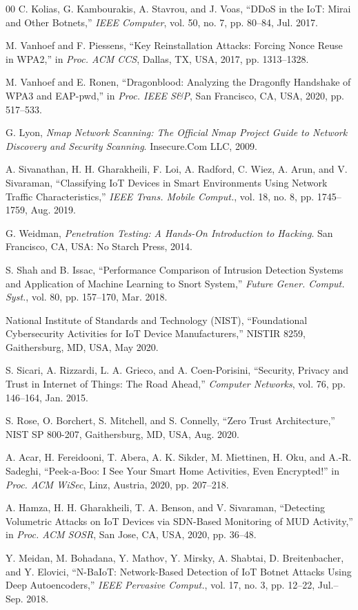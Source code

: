 \documentclass[conference]{IEEEtran}
\begin{document}
\begin{thebibliography}{00}
C. Kolias, G. Kambourakis, A. Stavrou, and J. Voas, ``DDoS in the IoT: Mirai and Other Botnets,'' \textit{IEEE Computer}, vol. 50, no. 7, pp. 80--84, Jul. 2017.

M. Vanhoef and F. Piessens, ``Key Reinstallation Attacks: Forcing Nonce Reuse in WPA2,'' in \textit{Proc. ACM CCS}, Dallas, TX, USA, 2017, pp. 1313--1328.

M. Vanhoef and E. Ronen, ``Dragonblood: Analyzing the Dragonfly Handshake of WPA3 and EAP-pwd,'' in \textit{Proc. IEEE S\&P}, San Francisco, CA, USA, 2020, pp. 517--533.

G. Lyon, \textit{Nmap Network Scanning: The Official Nmap Project Guide to Network Discovery and Security Scanning}. Insecure.Com LLC, 2009.

A. Sivanathan, H. H. Gharakheili, F. Loi, A. Radford, C. Wiez, A. Arun, and V. Sivaraman, ``Classifying IoT Devices in Smart Environments Using Network Traffic Characteristics,'' \textit{IEEE Trans. Mobile Comput.}, vol. 18, no. 8, pp. 1745--1759, Aug. 2019.

G. Weidman, \textit{Penetration Testing: A Hands-On Introduction to Hacking}. San Francisco, CA, USA: No Starch Press, 2014.

S. Shah and B. Issac, ``Performance Comparison of Intrusion Detection Systems and Application of Machine Learning to Snort System,'' \textit{Future Gener. Comput. Syst.}, vol. 80, pp. 157--170, Mar. 2018.

National Institute of Standards and Technology (NIST), ``Foundational Cybersecurity Activities for IoT Device Manufacturers,'' NISTIR 8259, Gaithersburg, MD, USA, May 2020.

S. Sicari, A. Rizzardi, L. A. Grieco, and A. Coen-Porisini, ``Security, Privacy and Trust in Internet of Things: The Road Ahead,'' \textit{Computer Networks}, vol. 76, pp. 146--164, Jan. 2015.

S. Rose, O. Borchert, S. Mitchell, and S. Connelly, ``Zero Trust Architecture,'' NIST SP 800-207, Gaithersburg, MD, USA, Aug. 2020.

A. Acar, H. Fereidooni, T. Abera, A. K. Sikder, M. Miettinen, H. Oku, and A.-R. Sadeghi, ``Peek-a-Boo: I See Your Smart Home Activities, Even Encrypted!'' in \textit{Proc. ACM WiSec}, Linz, Austria, 2020, pp. 207--218.

A. Hamza, H. H. Gharakheili, T. A. Benson, and V. Sivaraman, ``Detecting Volumetric Attacks on IoT Devices via SDN-Based Monitoring of MUD Activity,'' in \textit{Proc. ACM SOSR}, San Jose, CA, USA, 2020, pp. 36--48.

Y. Meidan, M. Bohadana, Y. Mathov, Y. Mirsky, A. Shabtai, D. Breitenbacher, and Y. Elovici, ``N-BaIoT: Network-Based Detection of IoT Botnet Attacks Using Deep Autoencoders,'' \textit{IEEE Pervasive Comput.}, vol. 17, no. 3, pp. 12--22, Jul.--Sep. 2018.

\end{thebibliography}
\end{document}
